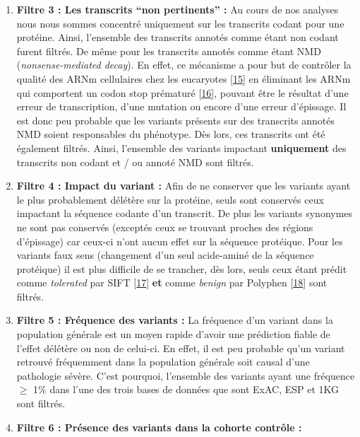 \documentclass[12pt,twoside]{reedthesis}
\theoremstyle{definition}
\theoremstyle{definition}
\theoremstyle{remark}
\begin{document}
  \begin{enumerate}
  \def\labelenumi{\arabic{enumi}.}
  \setcounter{enumi}{2}
  \item
    \textbf{Filtre 3 : Les transcrits ``non pertinents'' :} Au cours de
    nos analyses nous nous sommes concentré uniquement sur les transcrits
    codant pour une protéine. Ainsi, l'ensemble des transcrits annotés
    comme étant non codant furent filtrés. De même pour les transcrits
    annotés comme étant NMD (\emph{nonsense-mediated decay}). En effet, ce
    mécanisme a pour but de contrôler la qualité des ARNm cellulaires chez
    les eucaryotes {[}\protect\hyperlink{ref-Chang2007}{15}{]} en
    éliminant les ARNm qui comportent un codon stop prématuré
    {[}\protect\hyperlink{ref-Baker2004}{16}{]}, pouvant être le résultat
    d'une erreur de transcription, d'une mutation ou encore d'une erreur
    d'épissage. Il est donc peu probable que les variants présents sur des
    transcrits annotés NMD soient responsables du phénotype. Dès lors, ces
    transcrits ont été également filtrés. Ainsi, l'ensemble des variants
    impactant \textbf{uniquement} des transcrits non codant et / ou annoté
    NMD sont filtrés.
  \item
    \textbf{Filtre 4 : Impact du variant :} Afin de ne conserver que les
    variants ayant le plus probablement délétère sur la protéine, seuls
    sont conservés ceux impactant la séquence codante d'un transcrit. De
    plus les variants synonymes ne sont pas conservés (exceptés ceux se
    trouvant proches des régions d'épissage) car ceux-ci n'ont aucun effet
    sur la séquence protéique. Pour les variants faux sens (changement
    d'un seul acide-aminé de la séquence protéique) il est plus difficile
    de se trancher, dès lors, seuls ceux étant prédit comme
    \emph{tolerated} par SIFT {[}\protect\hyperlink{ref-Kumar2009}{17}{]}
    \textbf{et} comme \emph{benign} par Polyphen
    {[}\protect\hyperlink{ref-Adzhubei2010}{18}{]} sont filtrés.
  \item
    \textbf{Filtre 5 : Fréquence des variants :} La fréquence d'un variant
    dans la population générale est un moyen rapide d'avoir une prédiction
    fiable de l'effet délétère ou non de celui-ci. En effet, il est peu
    probable qu'un variant retrouvé fréquemment dans la population
    générale soit causal d'une pathologie sévère. C'est pourquoi,
    l'ensemble des variants ayant une fréquence \(\ge\) 1\% dans l'une des
    trois bases de données que sont ExAC, ESP et 1KG sont filtrés.
  \item
    \textbf{Filtre 6 : Présence des variants dans la cohorte contrôle :}

\end{enumerate}
\end{document}
